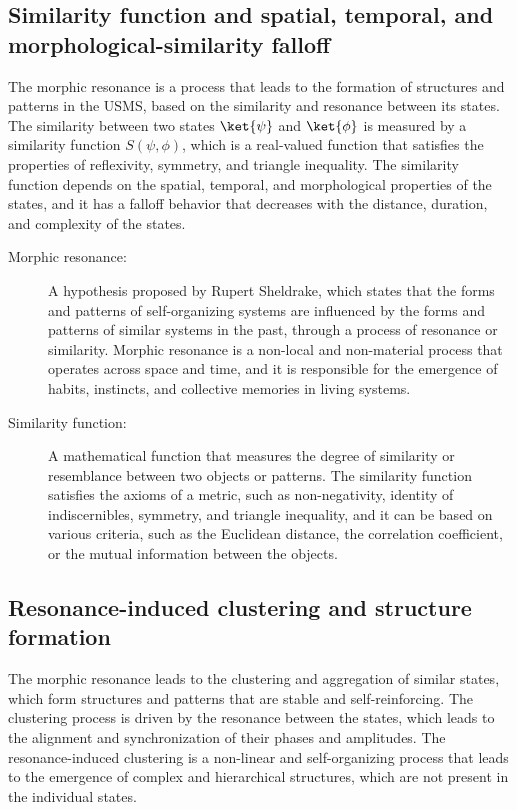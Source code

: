 \subsection{Similarity function and spatial, temporal, and morphological-similarity falloff}
The morphic resonance is a process that leads to the formation of structures and patterns in the USMS, based on the similarity and resonance between its states. The similarity between two states $\ket{\psi}$ and $\ket{\phi}$ is measured by a similarity function $S(\psi,\phi)$, which is a real-valued function that satisfies the properties of reflexivity, symmetry, and triangle inequality. The similarity function depends on the spatial, temporal, and morphological properties of the states, and it has a falloff behavior that decreases with the distance, duration, and complexity of the states.

\begin{tcolorbox}[colback=blue!5!white,colframe=blue!75!black,title=New terms]
    \begin{description}
        \item[Morphic resonance:] A hypothesis proposed by Rupert Sheldrake, which states that the forms and patterns of self-organizing systems are influenced by the forms and patterns of similar systems in the past, through a process of resonance or similarity. Morphic resonance is a non-local and non-material process that operates across space and time, and it is responsible for the emergence of habits, instincts, and collective memories in living systems.
        \item[Similarity function:] A mathematical function that measures the degree of similarity or resemblance between two objects or patterns. The similarity function satisfies the axioms of a metric, such as non-negativity, identity of indiscernibles, symmetry, and triangle inequality, and it can be based on various criteria, such as the Euclidean distance, the correlation coefficient, or the mutual information between the objects.
    \end{description}
\end{tcolorbox}

\subsection{Resonance-induced clustering and structure formation}
The morphic resonance leads to the clustering and aggregation of similar states, which form structures and patterns that are stable and self-reinforcing. The clustering process is driven by the resonance between the states, which leads to the alignment and synchronization of their phases and amplitudes. The resonance-induced clustering is a non-linear and self-organizing process that leads to the emergence of complex and hierarchical structures, which are not present in the individual states.

